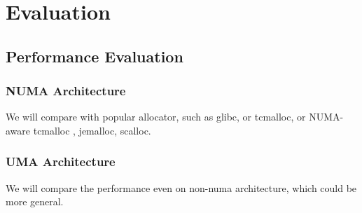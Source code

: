 \section{Evaluation}

\subsection{Performance Evaluation}

\subsubsection{NUMA Architecture}
We will compare with popular allocator, such as glibc, or tcmalloc, or NUMA-aware tcmalloc , jemalloc, scalloc. 




\subsubsection{UMA Architecture}
We will compare the performance even on non-numa architecture, which could be more general. 
